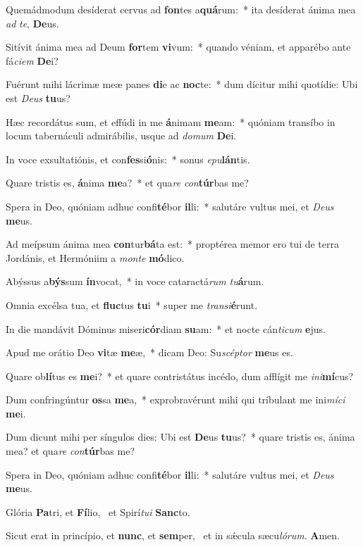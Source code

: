 \item Quemádmodum desíderat cervus ad \textbf{fon}tes a\textbf{quá}rum:~* ita desíderat ánima mea \textit{ad} \textit{te}, \textbf{De}us.
\item Sitívit ánima mea ad Deum \textbf{for}tem \textbf{vi}vum:~* quando véniam, et apparébo ante fá\textit{ci}\textit{em} \textbf{De}i?
\item Fuérunt mihi lácrimæ meæ panes \textbf{di}e ac \textbf{noc}te:~* dum dícitur mihi quotídie: Ubi est \textit{De}\textit{us} \textbf{tu}us?
\item Hæc recordátus sum, et effúdi in me \textbf{á}nimam \textbf{me}am:~* quóniam transíbo in locum tabernáculi admirábilis, usque ad \textit{do}\textit{mum} \textbf{De}i.
\item In voce exsultatiónis, et con\textbf{fes}si\textbf{ó}nis:~* sonus \textit{e}\textit{pu}\textbf{lán}tis.
\item Quare tristis es, \textbf{á}nima \textbf{me}a?~* et qua\textit{re} \textit{con}\textbf{túr}bas me?
\item Spera in Deo, quóniam adhuc confi\textbf{té}bor \textbf{il}li:~* salutáre vultus mei, et \textit{De}\textit{us} \textbf{me}us.
\item Ad meípsum ánima mea \textbf{con}tur\textbf{bá}ta est:~* proptérea memor ero tui de terra Jordánis, et Hermóniim a \textit{mon}\textit{te} \textbf{mó}dico.
\item Abýssus a\textbf{býs}sum \textbf{ín}vocat,~* in voce cataractá\textit{rum} \textit{tu}\textbf{á}rum.
\item Omnia excélsa tua, et \textbf{fluc}tus \textbf{tu}i~* super me \textit{trans}\textit{i}\textbf{é}runt.
\item In die mandávit Dóminus miseri\textbf{cór}diam \textbf{su}am:~* et nocte cán\textit{ti}\textit{cum} \textbf{e}jus.
\item Apud me orátio Deo \textbf{vi}tæ \textbf{me}æ,~* dicam Deo: Su\textit{scép}\textit{tor} \textbf{me}us es.
\item Quare ob\textbf{lí}tus es \textbf{me}i?~* et quare contristátus incédo, dum afflígit me \textit{in}\textit{i}\textbf{mí}cus?
\item Dum confringúntur \textbf{os}sa \textbf{me}a,~* exprobravérunt mihi qui tríbulant me ini\textit{mí}\textit{ci} \textbf{me}i.
\item Dum dicunt mihi per síngulos dies: Ubi est \textbf{De}us \textbf{tu}us?~* quare tristis es, ánima mea? et qua\textit{re} \textit{con}\textbf{túr}bas me?
\item Spera in Deo, quóniam adhuc confi\textbf{té}bor \textbf{il}li:~* salutáre vultus mei, et \textit{De}\textit{us} \textbf{me}us.
\item Glória \textbf{Pa}tri, et \textbf{Fí}lio,~\psstar{} et Spirí\textit{tu}\textit{i} \textbf{Sanc}to.
\item Sicut erat in princípio, et \textbf{nunc}, et \textbf{sem}per,~\psstar{} et in sǽcula sæcu\textit{ló}\textit{rum}. \textbf{A}men.